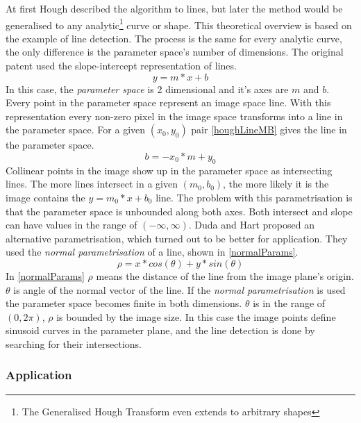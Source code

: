 At first Hough described the algorithm to lines, but later the method would be generalised to any analytic\footnote{The Generalised Hough Transform even extends to arbitrary shapes} curve or shape.
This theoretical overview is based on the example of line detection.
The process is the same for every analytic curve, the only difference is the parameter space's number of dimensions.
The original patent\cite{houghPatent} used the slope-intercept representation of lines.
\begin{equation}
y = m*x + b
\end{equation}
In this case, the \emph{parameter space} is 2 dimensional and it's axes are $m$ and $b$.
Every point in the parameter space represent an image space line.
With this representation every non-zero pixel in the image space transforms into a line in the parameter space.
For a given $(x_0,y_0)$ pair \eqref{houghLineMB} gives the line in the parameter space. 
\begin{equation}
\label{eq:houghLineMB}
b = -x_0*m + y_0
\end{equation}
Collinear points in the image show up in the parameter space as intersecting lines.
The more lines intersect in a given $(m_0,b_0)$, the more likely it is the image contains the $y = m_0*x + b_0$ line.
The problem with this parametrisation is that the parameter space is unbounded along both axes.
Both intersect and slope can have values in the range of $(-\infty, \infty)$.
Duda and Hart\cite{houghThetaRho} proposed an alternative parametrisation, which turned out to be better for application.
They used the \emph{normal parametrisation} of a line, shown in \eqref{normalParams}.
\begin{equation}
	\label{eq:normalParams}
	\rho = x*cos(\theta) + y*sin(\theta)
\end{equation}
In \eqref{normalParams} $\rho$ means the distance of the line from the image plane's origin.
$\theta$ is angle of the normal vector of the line.
If the \emph{normal parametrisation} is used the parameter space becomes finite in both dimensions.
$\theta$ is in the range of $(0,2\pi)$, $\rho$ is bounded by the image size.
In this case the image points define sinusoid curves in the parameter plane, and the line detection is done by searching for their intersections.

\subsubsection{Application}

